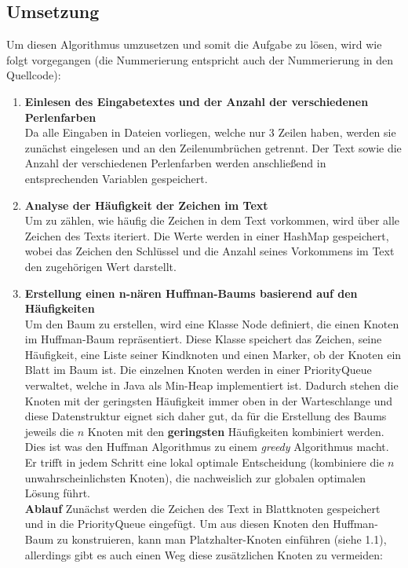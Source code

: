 \documentclass[a4paper,10pt,ngerman]{scrartcl}
\begin{document}
\subsection{Umsetzung}

Um diesen Algorithmus umzusetzen und somit die Aufgabe zu lösen, wird wie folgt vorgegangen (die Nummerierung entspricht auch der Nummerierung in den Quellcode): 
\begin{enumerate}
  \item \textbf{Einlesen des Eingabetextes und der Anzahl der verschiedenen Perlenfarben} \\
  Da alle Eingaben in Dateien vorliegen, welche nur 3 Zeilen haben, werden sie zunächst eingelesen und an den Zeilenumbrüchen getrennt. Der Text sowie die Anzahl der verschiedenen Perlenfarben werden anschließend in entsprechenden Variablen gespeichert. 
  \item \textbf{Analyse der Häufigkeit der Zeichen im Text} \\
  Um zu zählen, wie häufig die Zeichen in dem Text vorkommen, wird über alle Zeichen des Texts iteriert. Die Werte werden in einer HashMap gespeichert, wobei das Zeichen den Schlüssel und die Anzahl seines Vorkommens im Text den zugehörigen Wert darstellt. 
  \item \textbf{Erstellung einen n-nären Huffman-Baums basierend auf den Häufigkeiten} \\
  Um den Baum zu erstellen, wird eine Klasse Node definiert, die einen Knoten im Huffman-Baum repräsentiert. Diese Klasse speichert das Zeichen, seine Häufigkeit, eine Liste seiner Kindknoten und einen Marker, ob der Knoten ein Blatt im Baum ist. Die einzelnen Knoten werden in einer PriorityQueue verwaltet, welche in Java als Min-Heap implementiert ist. Dadurch stehen die Knoten mit der geringsten Häufigkeit immer oben in der Warteschlange und diese Datenstruktur eignet sich daher gut, da für die Erstellung des Baums jeweils die $n$ Knoten mit den \textbf{geringsten} Häufigkeiten kombiniert werden.\\
  Dies ist was den Huffman Algorithmus zu einem \textit{greedy} Algorithmus macht. Er trifft in jedem Schritt eine lokal optimale Entscheidung (kombiniere die $n$ unwahrscheinlichsten Knoten), die nachweislich zur globalen optimalen Lösung führt.\\
  \newline
  \textbf{Ablauf}
  \newline
  Zunächst werden die Zeichen des Text in Blattknoten gespeichert und in die PriorityQueue eingefügt. Um aus diesen Knoten den Huffman-Baum zu konstruieren, kann man Platzhalter-Knoten einführen (siehe 1.1), allerdings gibt es auch einen Weg diese zusätzlichen Knoten zu vermeiden: \\

\end{enumerate}
\end{document}
